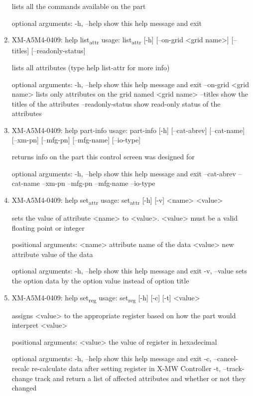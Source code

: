 \documentclass[11pt]{article}
\begin{document}
\begin{enumerate}
lists all the commands available on the part

optional arguments:
  -h, --help  show this help message and exit

\item XM-A5M4-0409: help list\textsubscript{attr}
\label{sec:orga320f45}
usage: list\textsubscript{attr} [-h] [--on-grid <grid name>] [--titles] [--readonly-status]

lists all attributes (type help list-attr for more info)

optional arguments:
  -h, --help            show this help message and exit
  --on-grid <grid name>
                        lists only attributes on the grid named <grid name>
  --titles              show the titles of the attributes
  --readonly-status     show read-only status of the attributes

\item XM-A5M4-0409: help part-info
\label{sec:orgc844dcc}
usage: part-info  [-h] [--cat-abrev] [--cat-name] [--xm-pn] [--mfg-pn] [--mfg-name]
        [--io-type]

returns info on the part this control screen was designed for

optional arguments:
  -h, --help   show this help message and exit
  --cat-abrev
  --cat-name
  --xm-pn
  --mfg-pn
  --mfg-name
  --io-type

\item XM-A5M4-0409: help set\textsubscript{attr}
\label{sec:org34b71d3}
usage: set\textsubscript{attr} [-h] [-v] <name> <value>

sets the value of attribute <name> to <value>. <value> must be a valid
floating point or integer

positional arguments:
  <name>       attribute name of the data
  <value>      new attribute value of the data

optional arguments:
  -h, --help   show this help message and exit
  -v, --value  sets the option data by the option value instead of option
               title

\item XM-A5M4-0409: help set\textsubscript{reg}
\label{sec:org2487eed}
usage: set\textsubscript{reg} [-h] [-c] [-t] <value>

assigns <value> to the appropriate register based on how the part would
interpret <value>

positional arguments:
  <value>              the value of register in hexadecimal

optional arguments:
  -h, --help           show this help message and exit
  -c, --cancel-recalc  re-calculate data after setting register in X-MW
                       Controller
  -t, --track-change   track and return a list of affected attributes and
                       whether or not they changed


\end{enumerate}
\end{document}
